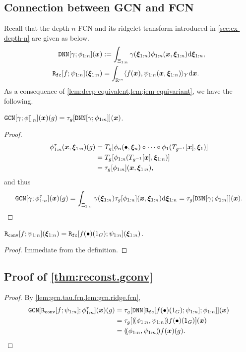 \subsection{Connection between GCN and FCN} \label{sec:gcn.detail}
Recall that the depth-$n$ FCN and its ridgelet transform introduced in \cref{sec:ex-depth-n} are given as below.
\begin{align*}
		\mathtt{DNN}[\gamma;\phi_{1:n}](\bm{x}) &:= \int_{\Xi_{1:n}} \gamma(\bm{\xi}_{1:n}) \phi_{1:n}(\bm{x},\bm{\xi}_{1:n}) \mathrm{d} \bm{\xi}_{1:n}, \\
        \mathtt{R_{fc}}[f;\psi_{1:n}](\bm{\xi}_{1:n}) &= \int_{\mathbb{R}^m} \langle f(\bm{x}),\psi_{1:n}(\bm{x},\bm{\xi}_{1:n})\rangle_Y\mathrm{d}\bm{x}.    
\end{align*}
As a consequence of \cref{lem:deep-equivalent,lem:jem-equivariant}, we have the following.
\begin{lemma} \label{lem:gcn.tau.fcn}
$\mathtt{GCN}[\gamma;\phi^\tau_{1:n}](\bm{x})(g) = \tau_g[\mathtt{DNN}[\gamma;\phi_{1:n}]](\bm{x})$.
\end{lemma}

\begin{proof}
\begin{align*}
\phi^\tau_{1:n}(\bm{x}, \bm{\xi}_{1:n})(g)
&= T_g[\phi_n(\bullet, \bm{\xi}_n) \circ \cdots \circ \phi_1(T_{g^{-1}}[\bm{x}], \bm{\xi}_1)]\\
&= T_g[\phi_{1:n}(T_{g^{-1}}[\bm{x}],\bm{\xi}_{1:n})]\\
&= \tau_g[\phi_{1:n}](\bm{x},\bm{\xi}_{1:n}),    
\end{align*}
and thus
\[
\mathtt{GCN}[\gamma;\phi^\tau_{1:n}](\bm{x})(g) = \int_{\Xi_{1:n}} \gamma(\bm{\xi}_{1:n}) \tau_g[\phi_{1:n}](\bm{x},\bm{\xi}_{1:n})\mathrm{d}\bm{\xi}_{1:n} = \tau_g[ \mathtt{DNN}[\gamma;\phi_{1:n}]](\bm{x}). \qedhere
\]
\end{proof}

\begin{lemma} \label{lem:gcn.ridge.fcn}
    $\mathtt{R_{conv}}[f;\psi_{1:n}](\bm{\xi}_{1:n}) = \mathtt{R_{fc}}[f(\bullet)(1_G);\psi_{1:n}](\bm{\xi}_{1:n})$.
\end{lemma}

\begin{proof}
    Immediate from the definition.
\end{proof}

\subsection{{Proof of \cref{thm:reconst.gconv}}} \label{sec:proof.reconst.gconv}

\begin{proof} By \cref{lem:gcn.tau.fcn,lem:gcn.ridge.fcn},
\begin{align*}
    \mathtt{GCN}[ \mathtt{R_{conv}}[f;\psi_{1:n}];\phi^\tau_{1:n} ](\bm{x})(g)
    &= \tau_g[ \mathtt{DNN}[ \mathtt{R_{fc}}[f(\bullet)(1_G);\psi_{1:n}];\phi_{1:n} ] ](\bm{x})\\
    &= \tau_g[ (\!(\phi_{1:n},\psi_{1:n})\!)f(\bullet)(1_G) ](\bm{x})\\
    &= (\!(\phi_{1:n},\psi_{1:n})\!)f(\bm{x})(g). \qedhere
\end{align*}    
\end{proof}

